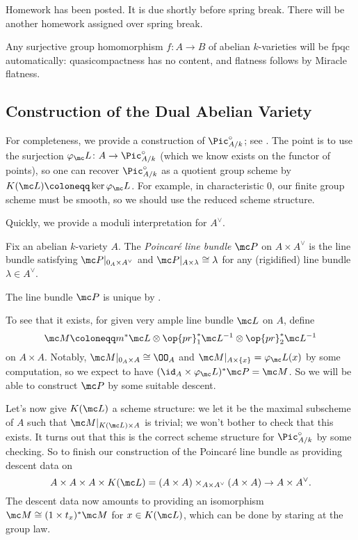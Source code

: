 \documentclass[../notes.tex]{subfiles}
\begin{document}
Homework has been posted. It is due shortly before spring break. There will be another homework assigned over spring break.
\begin{remark}
	Any surjective group homomorphism $f\colon A\to B$ of abelian $k$-varieties will be fpqc automatically: quasicompactness has no content, and flatness follows by Miracle flatness.
\end{remark}

\subsection{Construction of the Dual Abelian Variety}
For completeness, we provide a construction of $\Pic^\circ_{A/k}$; see \cite[{\S}II.8, {\S}III.13]{mumford}. The point is to use the surjection $\varphi_\mc L\colon A\to\Pic^\circ_{A/k}$ (which we know exists on the functor of points), so one can recover $\Pic^\circ_{A/k}$ as a quotient group scheme by $K(\mc L)\coloneqq\ker\varphi_\mc L$. For example, in characteristic $0$, our finite group scheme must be smooth, so we should use the reduced scheme structure.

Quickly, we provide a moduli interpretation for $A^\lor$.
\begin{definition}
	Fix an abelian $k$-variety $A$. The \textit{Poincar\'e line bundle} $\mc P$ on $A\times A^\lor$ is the line bundle satisfying $\mc P|_{0_A\times A^\lor}$ and $\mc P|_{A\times\lambda}\cong\lambda$ for any (rigidified) line bundle $\lambda\in A^\lor$.
\end{definition}
\begin{remark}
	The line bundle $\mc P$ is unique by .
\end{remark}
To see that it exists, for given very ample line bundle $\mc L$ on $A$, define
\[\mc M\coloneqq m^*\mc L\otimes\op{pr}_1^*\mc L^{-1}\otimes\op{pr}_2^*\mc L^{-1}\]
on $A\times A$. Notably, $\mc M|_{0_A\times A}\cong\OO_A$ and $\mc M|_{A\times\{x\}}=\varphi_\mc L(x)$ by some computation, so we expect to have $({\id_A}\times\varphi_\mc L)^*\mc P=\mc M$. So we will be able to construct $\mc P$ by some suitable descent.

Let's now give $K(\mc L)$ a scheme structure: we let it be the maximal subscheme of $A$ such that $\mc M|_{K(\mc L)\times A}$ is trivial; we won't bother to check that this exists. It turns out that this is the correct scheme structure for $\Pic^\circ_{A/k}$ by some checking. So to finish our construction of the Poincar\'e line bundle as providing descent data on
\[A\times A\times A\times K(\mc L)=(A\times A)\times_{A\times A^\lor}(A\times A)\to A\times A^\lor.\]
The descent data now amounts to providing an isomorphism $\mc M\cong(1\times t_x)^*\mc M$ for $x\in K(\mc L)$, which can be done by staring at the group law.
\end{document}
